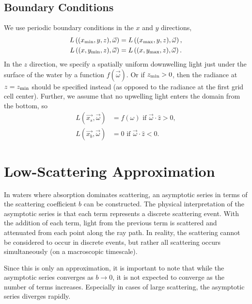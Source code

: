 \subsection{Boundary Conditions}

We use periodic boundary conditions in the $x$ and $y$ directions,
\begin{align*}
  L\left(({x_{\min}}, y, z), \vec{\omega}\right) &= L\left(({x_{\max}}, y, z), \vec{\omega}\right), \\
  L\left((x, {y_{\min}}, z), \vec{\omega}\right) &= L\left((x, {y_{\max}}, z), \vec{\omega}\right).
\end{align*}
In the $z$ direction, we specify a spatially uniform downwelling light just
under the surface of the water by a function $f(\vec{\omega})$.
Or if ${z_{\min}}>0$, then the radiance at $z={z_{\min}}$ should be specified instead (as opposed to the radiance at the first grid cell center).
Further, we assume that no upwelling light enters the domain from the bottom, so
\begin{align*}
  L(\vec{x_s}, \vec{\omega}) &= f(\omega) \mbox{ if } \vec{\omega} \cdot \hat{z} > 0, \\
  L(\vec{x_b}, \vec{\omega}) &= 0 \mbox { if } \vec{\omega} \cdot \hat{z} < 0.
\end{align*}

\section{Low-Scattering Approximation}
In waters where absorption dominates scattering, an asymptotic series in terms of the scattering coefficient $b$ can be constructed.
The physical interpretation of the asymptotic series is that each term represents a discrete scattering event.
With the addition of each term, light from the previous term is scattered and attenuated from each point along the ray path.
In reality, the scattering cannot be considered to occur in discrete events, but rather all scattering occurs simultaneously (on a macroscopic timescale).

Since this is only an approximation, it is important to note that while the asymptotic series converges as $b \to 0$, it is not expected to converge as the number of terms increases.
Especially in cases of large scattering, the asymptotic series diverges rapidly.
